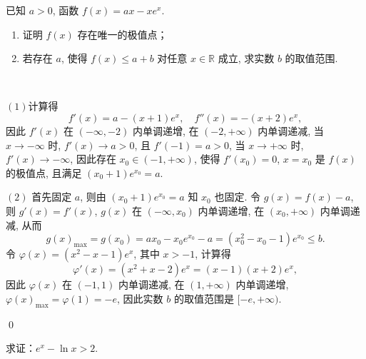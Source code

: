 \begin{example}[2021年天津]
    已知 $a > 0$, 函数 $f(x) = ax - xe^x$. 
\begin{enumerate}
    \item 证明 $f(x)$ 存在唯一的极值点；
    \item 若存在 $a$, 使得 $f(x) \leqslant a + b$ 对任意 $x \in \mathbb{R}$ 成立, 求实数 $b$ 的取值范围. 
\end{enumerate}
\end{example}
\begin{jie}
    \ 

    \((1)\)计算得
    \[
    f'(x) = a - (x + 1)e^x, \quad f''(x) = -(x + 2)e^x,
    \]
    因此 $f'(x)$ 在 $(-\infty, -2)$ 内单调递增, 在 $(-2, +\infty)$ 内单调递减, 
    当 $x \to -\infty$ 时, $f'(x) \to a > 0$, 且 $f'(-1) = a > 0$, 
    当 $x \to +\infty$ 时, $f'(x) \to -\infty$, 
    因此存在 $x_0 \in (-1, +\infty)$, 使得 $f'(x_0) = 0$, 
    $x = x_0$ 是 $f(x)$ 的极值点, 且满足 $(x_0 + 1)e^{x_0} = a$. 


    \((2)\)
    首先固定 $a$, 则由 $(x_0 + 1)e^{x_0} = a$ 知 $x_0$ 也固定. 令 $g(x) = f(x) - a$, 则 $g'(x) = f'(x)$, $g(x)$ 在 $(-\infty, x_0)$ 内单调递增, 在 $(x_0, +\infty)$ 内单调递减, 从而
    \[g(x)_{\max} = g(x_0) = ax_0 - x_0e^{x_0} - a = (x_0^2 - x_0 - 1)e^{x_0} \leqslant b.\]
    令 $\varphi(x) = (x^2 - x - 1)e^x$, 其中 $x > -1$, 计算得
    \[\varphi'(x) = (x^2 + x - 2)e^x = (x - 1)(x + 2)e^x,\]
    因此 $\varphi(x)$ 在 $(-1, 1)$ 内单调递减, 在 $(1, +\infty)$ 内单调递增, 
    $\varphi(x)_{\max} = \varphi(1) = -e$, 因此实数 $b$ 的取值范围是 $[-e, +\infty)$. 

    \qed
\end{jie}

















\begin{example}
    求证：\(e^x-\ln x >2\).
\end{example}




















